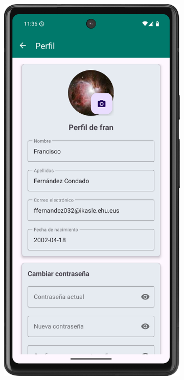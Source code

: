 \begin{figure}[H]
     \centering
     \begin{subfigure}[b]{0.4\textwidth}
         \centering
         \includegraphics[width=\textwidth]{root/perfil.png}

\end{subfigure}
\end{figure}
